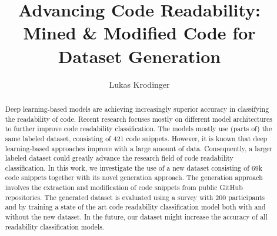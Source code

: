 \documentclass[%
class=scrreprt,
chapterprefix=false,%
open=right,%
twoside=false,%
paper=a4,%
logofile={Logo\_zentral\_farbig\_EN.png},%
thesistype=master,%
UKenglish,%
]{se2thesis}
\author{Lukas Krodinger}
\title{Advancing Code Readability: Mined \& Modified Code for Dataset Generation}
\institute{Chair of Software Engineering II}
\theoremstyle{definition}
\newcommand{\numSamples}{69k\xspace}
\begin{document}
	
	\frontmatter
	
	\maketitle
	
	\begin{abstract}
		
		
		Deep learning-based models are achieving increasingly superior accuracy in classifying the readability of code.
		Recent research focuses mostly on different model architectures to further improve code readability classification. The models mostly use (parts of) the same labeled dataset, consisting of 421 code snippets.
		However, it is known that deep learning-based approaches improve with a large amount of data.
		Consequently, a larger labeled dataset could greatly advance the research field of code readability classification.
		In this work, we investigate the use of a new dataset consisting of \numSamples code snippets together with its novel generation approach.
		The generation approach involves the extraction and modification of code snippets from public GitHub repositories. The generated dataset is evaluated using a survey with 200 participants and by training a state of the art code readability classification model both with and without the new dataset.
		In the future, our dataset might increase the accuracy of all readability classification models.
		

	\end{abstract}
	
\end{document}
